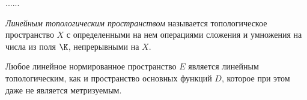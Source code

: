......

\begin{definition}
	\textit{Линейным топологическим пространством} называется топологическое пространство $X$ с определенными на нем операциями сложения и умножения на числа из поля $\K$, непрерывными на $X$.
\end{definition}

\begin{example}
	Любое линейное нормированное пространство $E$ является линейным топологическим, как и пространство основных функций $D$, которое при этом даже не является метризуемым.
\end{example}